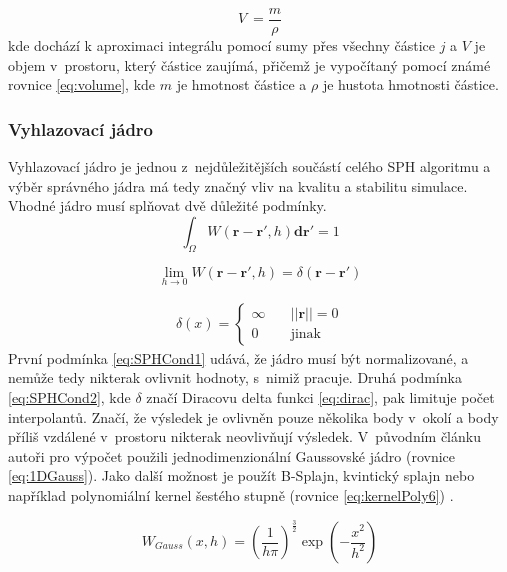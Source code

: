 \begin{equation}
	V~= \frac{m}{\rho}
	\label{eq:volume}
\end{equation}
kde dochází k aproximaci integrálu pomocí sumy přes všechny částice $j$ a $V$ je objem v~prostoru, který částice zaujímá, přičemž je vypočítaný pomocí známé rovnice \ref{eq:volume}, kde $m$ je hmotnost částice a $\rho$ je hustota hmotnosti částice.  \cite{KelagerSPH}

\subsubsection{Vyhlazovací jádro}
Vyhlazovací jádro je jednou z~nejdůležitějších součástí celého SPH algoritmu a výběr správného jádra má tedy značný vliv na kvalitu a stabilitu simulace. Vhodné jádro musí splňovat dvě důležité podmínky.
\begin{equation}
	\int_\Omega W(\mathbf{r} - \mathbf{r}', h)\mathbf{dr}' = 1
	\label{eq:SPHCond1}
\end{equation}

\begin{equation}
	\lim_{h \to 0} W(\mathbf{r} - \mathbf{r}',h) = \delta(\mathbf{r} - \mathbf{r}')
	\label{eq:SPHCond2}
\end{equation}

\begin{equation} \label{eq:dirac}
	\begin{gathered}
		\delta(x) =
		\begin{cases}
			\infty & \quad ||\mathbf{r}|| = 0 \\
			0      & \quad \text{jinak}
		\end{cases}
	\end{gathered}
\end{equation}
První podmínka \ref{eq:SPHCond1} udává, že jádro musí být normalizované, a nemůže tedy nikterak ovlivnit hodnoty, s~nimiž pracuje. Druhá podmínka \ref{eq:SPHCond2}, kde $\delta$ značí Diracovu delta funkci \ref{eq:dirac}, pak limituje počet interpolantů. Značí, že výsledek je ovlivněn pouze několika body v~okolí a body příliš vzdálené v~prostoru nikterak neovlivňují výsledek. V~původním článku autoři pro výpočet použili jednodimenzionální Gaussovské jádro (rovnice \ref{eq:1DGauss}). Jako další možnost je použít B-Splajn, kvintický splajn \cite{Liu2010} nebo například polynomiální kernel šestého stupně (rovnice \ref{eq:kernelPoly6}) \cite{Muller03}.

\begin{equation}
	W_{Gauss}(x,h) = \left(\frac{1}{h\pi}\right)^\frac{3}{2}\exp{\left(-\frac{x^2}{h^2}\right)}
	\label{eq:1DGauss}
\end{equation}

